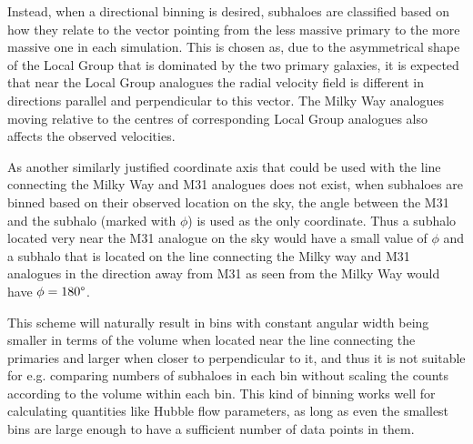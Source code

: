 \documentclass[english, oneside]{HYgradu}
\begin{document}
Instead, when a directional binning is desired, subhaloes are classified based on how they relate to the vector pointing from the less massive primary to the more massive one in each simulation. This is chosen as, due to the asymmetrical shape of the Local Group that is dominated by the two primary galaxies, it is expected that near the Local Group analogues the radial velocity field is different in directions parallel and perpendicular to this vector. The Milky Way analogues moving relative to the centres of corresponding Local Group analogues also affects the observed velocities.

As another similarly justified coordinate axis that could be used with the line connecting the Milky Way and M31 analogues does not exist, when subhaloes are binned based on their observed location on the sky, the angle between the M31 and the subhalo (marked with $\phi$) is used as the only coordinate. Thus a subhalo located very near the M31 analogue on the sky would have a small value of $\phi$ and a subhalo that is located on the line connecting the Milky way and M31 analogues in the direction away from M31 as seen from the Milky Way would have $\phi = 180 \degree$.

This scheme will naturally result in bins with constant angular width being smaller in terms of the volume when located near the line connecting the primaries and larger when closer to perpendicular to it, and thus it is not suitable for e.g. comparing numbers of subhaloes in each bin without scaling the counts according to the volume within each bin. This kind of binning works well for calculating quantities like Hubble flow parameters, as long as even the smallest bins are large enough to have a sufficient number of data points in them.
\end{document}
